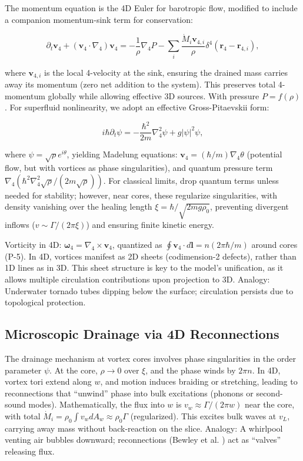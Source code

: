 \documentclass{article}
\begin{document}
The momentum equation is the 4D Euler for barotropic flow, modified to include a companion momentum-sink term for conservation:

\[
\partial_t \mathbf{v}_4 + (\mathbf{v}_4 \cdot \nabla_4) \mathbf{v}_4 = -\frac{1}{\rho} \nabla_4 P - \sum_i \frac{\dot{M}_i \mathbf{v}_{4,i}}{\rho} \delta^4(\mathbf{r}_4 - \mathbf{r}_{4,i}),
\]

where $\mathbf{v}_{4,i}$ is the local 4-velocity at the sink, ensuring the drained mass carries away its momentum (zero net addition to the system). This preserves total 4-momentum globally while allowing effective 3D sources. With pressure $P = f(\rho)$. For superfluid nonlinearity, we adopt an effective Gross-Pitaevskii form:

\[
i \hbar \partial_t \psi = -\frac{\hbar^2}{2 m} \nabla_4^2 \psi + g |\psi|^2 \psi,
\]

where $\psi = \sqrt{\rho} e^{i \theta}$, yielding Madelung equations: $\mathbf{v}_4 = (\hbar / m) \nabla_4 \theta$ (potential flow, but with vortices as phase singularities), and quantum pressure term $\nabla_4 (\hbar^2 \nabla_4^2 \sqrt{\rho} / (2 m \sqrt{\rho}))$. For classical limits, drop quantum terms unless needed for stability; however, near cores, these regularize singularities, with density vanishing over the healing length $\xi = \hbar / \sqrt{2 m g \rho_0}$, preventing divergent inflows ($v \sim \Gamma / (2\pi \xi)$) and ensuring finite kinetic energy.

Vorticity in 4D: $\boldsymbol{\omega}_4 = \nabla_4 \times \mathbf{v}_4$, quantized as $\oint \mathbf{v}_4 \cdot d\mathbf{l} = n (2\pi \hbar / m)$ around cores (P-5). In 4D, vortices manifest as 2D sheets (codimension-2 defects), rather than 1D lines as in 3D. This sheet structure is key to the model's unification, as it allows multiple circulation contributions upon projection to 3D. Analogy: Underwater tornado tubes dipping below the surface; circulation persists due to topological protection.

\subsection{Microscopic Drainage via 4D Reconnections}

The drainage mechanism at vortex cores involves phase singularities in the order parameter $\psi$. At the core, $\rho \to 0$ over $\xi$, and the phase winds by $2\pi n$. In 4D, vortex tori extend along $w$, and motion induces braiding or stretching, leading to reconnections that ``unwind'' phase into bulk excitations (phonons or second-sound modes). Mathematically, the flux into $w$ is $v_w \approx \Gamma / (2\pi w)$ near the core, with total $\dot{M}_i = \rho_0 \int v_w dA_w \approx \rho_0 \Gamma$ (regularized). This excites bulk waves at $v_L$, carrying away mass without back-reaction on the slice. Analogy: A whirlpool venting air bubbles downward; reconnections (Bewley et al. \cite{bewley2008characterization}) act as ``valves'' releasing flux.
\end{document}
